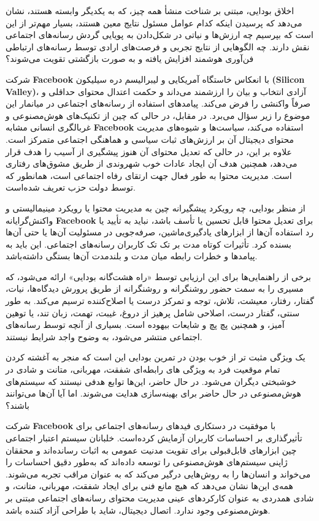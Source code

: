 اخلاق بودایی، مبتنی بر شناخت منشأ همه چیز، که به یکدیگر وابسته هستند، نشان می‌دهد که پرسیدن اینکه کدام عوامل مسئول نتایج معین هستند، بسیار مهم‌تر از این است که بپرسیم چه ارزش‌ها و نیاتی در شکل‌دادن به پویایی گردش رسانه‌های اجتماعی نقش دارند.
چه الگوهایی از نتایج تجربی و فرصت‌های ارادی توسط رسانه‌های ارتباطی فن‌آوری هوشمند افزایش یافته و به صورت بازگشتی تقویت می‌شوند؟

شرکت \textenglish{\textbf{Facebook}} با انعکاس خاستگاه آمریکایی و لیبرالیسم دره سیلیکون \textenglish{\textbf{(Silicon Valley)}}، آزادی انتخاب و بیان را ارزشمند می‌داند و حکمت اعتدال محتوای حداقلی و صرفاً واکنشی را فرض می‌کند.
پیامدهای استفاده از رسانه‌های اجتماعی در میانمار این موضوع را زیر سؤال می‌برد.
در مقابل، در حالی که چین از تکنیک‌های هوش‌مصنوعی و غربالگری انسانی مشابه \textenglish{\textbf{Facebook}} استفاده می‌کند، سیاست‌ها و شیوه‌های مدیریت محتوای دیجیتال آن بر ارزش‌های ثبات سیاسی و هماهنگی اجتماعی متمرکز است.
علاوه بر این، در حالی که تعدیل محتوای آن هنوز پیشگیری از آسیب را هدف قرار می‌دهد، همچنین هدف آن ایجاد عادات خوب شهروندی از طریق مشوق‌های رفتاری است.
مدیریت محتوا به طور فعال جهت ارتقای رفاه اجتماعی است، همانطور که توسط دولت حزب تعریف شده‌است.

از منظر بودایی، چه رویکرد پیشگیرانه چین به مدیریت محتوا یا رویکرد مینیمالیستی و واکنش‌گرایانه \textenglish{\textbf{Facebook}} برای تعدیل محتوا قابل تحسین یا تأسف باشد، نباید به تأیید یا رد استفاده آن‌ها از ابزارهای یادگیری‌ماشین، صرفه‌جویی در مسئولیت آن‌ها یا حتی آن‌ها بسنده کرد.
تأثیرات کوتاه مدت بر تک تک کاربران رسانه‌های اجتماعی.
این باید به پیامدها و خطرات رابطه میان مدت و بلندمدت آن‌ها بستگی داشته‌باشد.

برخی از راهنمایی‌ها برای این ارزیابی توسط «راه هشت‌گانه بودایی» ارائه می‌شود، که مسیری را به سمت حضور روشنگرانه و روشنگرانه از طریق پرورش دیدگاه‌ها، نیات، گفتار، رفتار، معیشت، تلاش، توجه و تمرکز درست یا اصلاح‌کننده ترسیم می‌کند.
به طور سنتی، گفتار درست، اصلاحی شامل پرهیز از دروغ، غیبت، تهمت، زبان تند، یا توهین آمیز، و همچنین پچ پچ و شایعات بیهوده است.
بسیاری از آنچه توسط رسانه‌های اجتماعی منتشر می‌شود، به وضوح واجد شرایط نیستند.

یک ویژگی مثبت تر از خوب بودن در تمرین بودایی این است که منجر به آغشته کردن تمام موقعیت فرد به ویژگی های رابطه‌ای شفقت، مهربانی، متانت و شادی در خوشبختی دیگران می‌شود.
در حال حاضر، این‌ها توابع هدفی نیستند که سیستم‌های هوش‌مصنوعی در حال حاضر برای بهینه‌سازی هدایت می‌شوند.
اما آیا آن‌ها می‌توانند باشند؟

شرکت \textenglish{\textbf{Facebook}} با موفقیت در دستکاری فیدهای رسانه‌های اجتماعی برای تأثیرگذاری بر احساسات کاربران آزمایش کرده‌است.
خلبانان سیستم اعتبار اجتماعی چین ابزارهای قابل‌قبولی برای تقویت مدنیت عمومی به اثبات رسانده‌اند و محققان ژاپنی سیستم‌های هوش‌مصنوعی را توسعه داده‌اند که به‌طور دقیق احساسات را می‌خواند و انسان‌ها را به روش‌هایی درگیر می‌کند که به عنوان مراقب تجربه می‌شوند.
همه‌ی این‌ها نشان می‌دهد که هیچ مانع فنی برای ایجاد شفقت، مهربانی، متانت، و شادی همدردی به عنوان کارکردهای عینی مدیریت محتوای رسانه‌های اجتماعی مبتنی بر هوش‌مصنوعی وجود ندارد.
اتصال دیجیتال، شاید با طراحی آزاد کننده باشد.
\newpage

